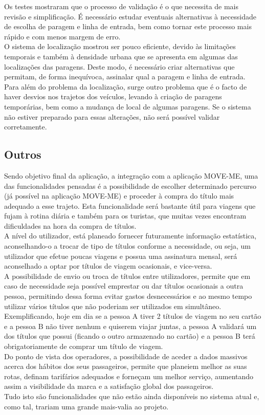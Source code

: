 Os testes mostraram que o processo de validação é o que necessita de mais revisão e simplificação. É necessário estudar eventuais alternativas à necessidade de escolha de paragem e linha de entrada, bem como tornar este processo mais rápido e com menos margem de erro.
\\O sistema de localização mostrou ser pouco eficiente, devido às limitações temporais e também à densidade urbana que se apresenta em algumas das localizações das paragens. Deste modo, é necessário criar alternativas que permitam, de forma inequívoca, assinalar qual a paragem e linha de entrada.
\\Para além do problema da localização, surge outro problema que é o facto de haver desvios nos trajetos dos veículos, levando à criação de paragens temporárias, bem como a mudança de local de algumas paragens. Se o sistema não estiver preparado para essas alterações, não será possível validar corretamente.

\subsection{Outros}

Sendo objetivo final da aplicação, a integração com a aplicação MOVE-ME, uma das funcionalidades pensadas é a possibilidade de escolher determinado percurso (já possível na aplicação MOVE-ME) e proceder à compra do título mais adequado a esse trajeto. Esta funcionalidade será bastante útil para viagens que fujam à rotina diária e também para os turistas, que muitas vezes encontram dificuldades na hora da compra de títulos.
\\A nível do utilizador, está planeado fornecer futuramente informação estatística, aconselhando-o a trocar de tipo de títulos conforme a necessidade, ou seja, um utilizador que efetue poucas viagens e possua uma assinatura mensal, será aconselhado a optar por títulos de viagem ocasionais, e vice-versa.
\\A possibilidade de envio ou troca de títulos entre utilizadores, permite que em caso de necessidade seja possível emprestar ou dar títulos ocasionais a outra pessoa, permitindo dessa forma evitar gastos desnecessários e ao mesmo tempo utilizar vários títulos que não poderiam ser utilizados em simultâneo. Exemplificando, hoje em dia se a pessoa A tiver 2 títulos de viagem no seu cartão e a pessoa B não tiver nenhum e quiserem viajar juntas, a pessoa A validará um dos títulos que possui (ficando o outro armazenado no cartão) e a pessoa B terá obrigatoriamente de comprar um título de viagem.
\\Do ponto de vista dos operadores, a possibilidade de aceder a dados massivos acerca dos hábitos dos seus passageiros, permite que planeiem melhor as suas rotas, definam tarifários adequados e forneçam um melhor serviço, aumentando assim a visibilidade da marca e a satisfação global dos passageiros.
\\Tudo isto são funcionalidades que não estão ainda disponíveis no sistema atual e, como tal, trariam uma grande mais-valia ao projeto.

